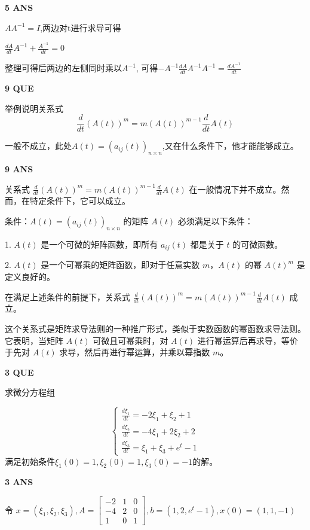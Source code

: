 \documentclass[11pt,letterpaper]{ctexart}
\begin{document}
\begin{enumerate}
\textbf{5 ANS}
\bigskip

$AA^{-1} = I$,两边对t进行求导可得

$\frac{dA}{dt}A^{-1} + \frac{A^{-1}}{dt} = 0$ 

整理可得后两边的左侧同时乘以$A^{-1}$, 可得$-A^{-1}\frac{dA}{dt}A^{-1}A^{-1} = \frac{dA^{-1}}{dt}$ 


\textbf{9 QUE}
\bigskip

举例说明关系式 \[ \frac{d}{dt}(A(t))^m = m(A(t))^{m - 1}\frac{d}{dt}A(t)\]

一般不成立，此处$A(t) = (a_{ij}(t))_{n \times n}$,又在什么条件下，他才能能够成立。



\textbf{9 ANS}
\bigskip

关系式 \(\frac{d}{dt}(A(t))^m = m(A(t))^{m - 1}\frac{d}{dt}A(t)\) 在一般情况下并不成立。然而，在特定条件下，它可以成立。

条件：\(A(t) = (a_{ij}(t))_{n \times n}\) 的矩阵 \(A(t)\) 必须满足以下条件：

1. \(A(t)\) 是一个可微的矩阵函数，即所有 \(a_{ij}(t)\) 都是关于 \(t\) 的可微函数。

2. \(A(t)\) 是一个可幂乘的矩阵函数，即对于任意实数 \(m\)，\(A(t)\) 的幂 \(A(t)^m\) 是定义良好的。

在满足上述条件的前提下，关系式 \(\frac{d}{dt}(A(t))^m = m(A(t))^{m - 1}\frac{d}{dt}A(t)\) 成立。

这个关系式是矩阵求导法则的一种推广形式，类似于实数函数的幂函数求导法则。它表明，当矩阵 \(A(t)\) 可微且可幂乘时，对 \(A(t)\) 进行幂运算后再求导，等价于先对 \(A(t)\) 求导，然后再进行幂运算，并乘以幂指数 \(m\)。

\textbf{3 QUE}
\bigskip

求微分方程组

\[
\begin{cases}
\frac{d\xi_1}{dt} = -2\xi_1+\xi_2 + 1 \\
\frac{d\xi_2}{dt} = -4\xi_1+2\xi_2 + 2 \\
\frac{d\xi_3}{dt} = \xi_1+\xi_3 + e^t - 1 
\end{cases} \]满足初始条件$\xi_1(0) = 1, \xi_2(0) = 1, \xi_3(0) = -1$的解。

\textbf{3 ANS}
\bigskip

令 $x = (\xi_1, \xi_2, \xi_3), A = \begin{bmatrix}
	-2 & 1 & 0 \\
	-4 & 2 & 0 \\
	1 & 0 &  1
\end{bmatrix}, b = (1, 2, e^t -1), x(0) = (1,1,-1)$ 


\end{enumerate}
\end{document}
